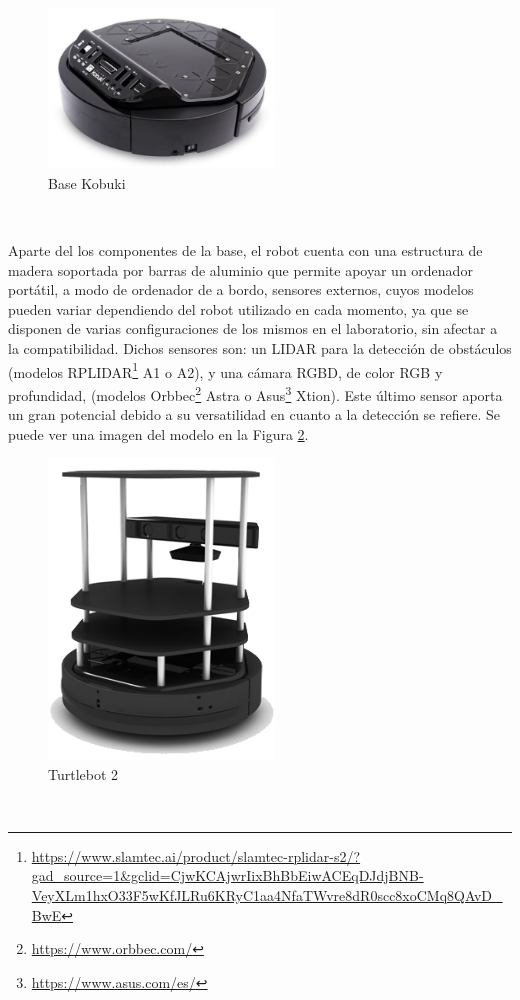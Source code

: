 \begin{figure} [h!]
  \begin{center}
    \includegraphics[width=6cm]{figs/kobuki_base}
  \end{center}
  \caption{Base Kobuki \cite{kobuki_base}}
  \label{fig:base_kobuki}
\end{figure}\

Aparte del los componentes de la base, el robot cuenta con una estructura de
madera soportada por barras de aluminio que permite apoyar un ordenador
portátil, a modo de ordenador de a bordo, sensores externos, cuyos modelos
pueden variar dependiendo del robot utilizado en cada momento, ya que se
disponen de varias configuraciones de los mismos en el laboratorio, sin afectar
a la compatibilidad.
Dichos sensores son: un LIDAR para la detección de obstáculos (modelos
RPLIDAR\footnote{\url{https://www.slamtec.ai/product/slamtec-rplidar-s2/?gad_source=1&gclid=CjwKCAjwrIixBhBbEiwACEqDJdjBNB-VeyXLm1hxO33F5wKfJLRu6KRyC1aa4NfaTWvre8dR0scc8xoCMq8QAvD_BwE}}
A1 o A2), y una cámara RGBD, de color RGB y profundidad, (modelos
Orbbec\footnote{\url{https://www.orbbec.com/}} Astra o
Asus\footnote{\url{https://www.asus.com/es/}} Xtion).
Este último sensor aporta un gran potencial debido a su versatilidad en cuanto a
la detección se refiere.
Se puede ver una imagen del modelo en la Figura \ref{fig:turtlebot2}.

\begin{figure} [h!]
  \begin{center}
    \includegraphics[width=6cm]{figs/turtlebot2}
  \end{center}
  \caption{Turtlebot 2 \cite{turtlebot4}}
  \label{fig:turtlebot2}
\end{figure}\

